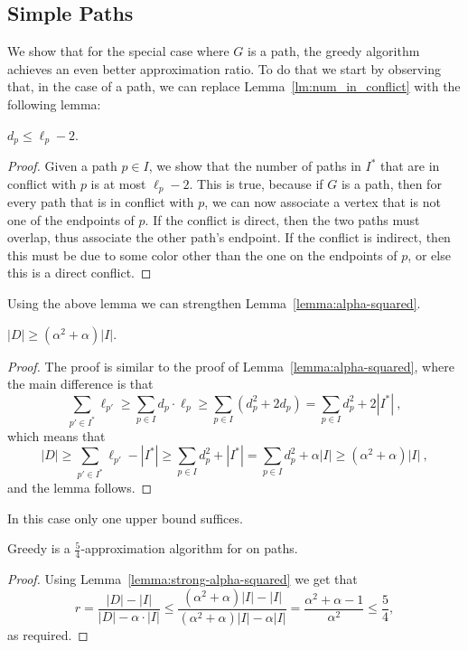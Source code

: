 
\subsection{Simple Paths}
%
We show that for the special case where $G$ is a path, the greedy
algorithm achieves an even better approximation ratio.  To do that we
start by observing that, in the case of a path, we can replace
Lemma~\ref{lm:num_in_conflict} with the following lemma:

\begin{lemma}
$d_p \leq \ell_p - 2$.
\end{lemma}
\begin{proof}
Given a path $p \in I$, we show that the number of paths in $I^*$ that
are in conflict with $p$ is at most $\ell_p - 2$.  This is true,
because if $G$ is a  path, then for every path that is in
conflict with $p$, we can now associate a vertex that is not one of
the endpoints of $p$.  If the conflict is direct, then the two paths
must overlap, thus associate the other path's endpoint.  If the
conflict is indirect, then this must be due to some color other than
the one on the endpoints of $p$, or else this is a direct conflict.
\end{proof}

Using the above lemma we can strengthen
Lemma~\ref{lemma:alpha-squared}.

\begin{lemma}
\label{lemma:strong-alpha-squared}
$|D| \geq (\alpha^2+\alpha)|I|$.
\end{lemma}
\begin{proof}
The proof is similar to the proof of Lemma~\ref{lemma:alpha-squared},
where the main difference is that
\[
\sum_{p' \in I^*} \ell_{p'}
\geq \sum_{p \in I} d_p \cdot \ell_p
\geq \sum_{p \in I} (d_p^2 + 2d_p)
=    \sum_{p \in I} d_p^2 + 2|I^*|
~,
\]
which means that 
\[
|D| 
\geq \sum_{p' \in I^*} \ell_{p'} - |I^*|
\geq \sum_{p \in I} d_p^2 + |I^*|
=    \sum_{p \in I} d_p^2 + \alpha |I|
\geq (\alpha^2 + \alpha) |I|
~,
\]
and the lemma follows.
\end{proof}

In this case only one upper bound suffices.

\begin{theorem}
Greedy is a $\frac{5}{4}$-approximation algorithm for
\TWOCR{} on paths.
\end{theorem}
\begin{proof}
Using Lemma~\ref{lemma:strong-alpha-squared} we get that
\[
r	=    
\frac{|D| - |I|}{|D| - \alpha \cdot |I|}
\leq 
\frac{
	(\alpha^2 + \alpha)|I| - |I|
}{
	(\alpha^2 + \alpha)|I| - \alpha |I|
}
=    \frac{\alpha^2 + \alpha - 1}{\alpha^2}
\leq \frac{5}{4}
,
\]
as required.
\end{proof}

